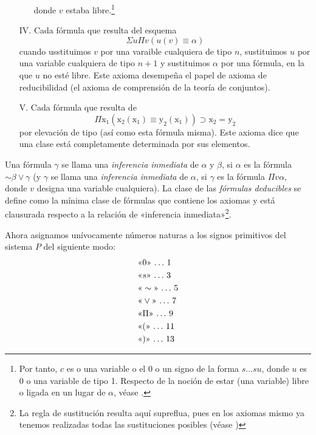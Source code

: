 \begin{enumerate}
\begin{enumerate}
                            donde $v$ estaba libre.\footnote{Por tanto, $c$ es o una variable o el $0$ o un signo de la forma $s\dots su$, donde $u$ es $0$ o una variable
                            de tipo 1. Respecto de la noción de estar (una variable) libre o ligada en un lugar de $\alpha$, véase \cite{v1927hilbertschen}.}
                \end{enumerate}
    \item[IV.]  Cada fórmula que resulta del esquema $$ \Sigma u \Pi v (u(v) \equiv \alpha) $$ cuando usstituimos $v$ por una varaible cualquiera de tipo $n$, sustituimos
                $u$ por una variable cualquiera de tipo $n+1$ y sustituimos $\alpha$ por una fórmula, en la que $u$ no esté libre. Este axioma desempeña el papel de axioma
                de reducibilidad (el axioma de comprensión de la teoría de conjuntos).
    \item[V.]   Cada fórmula que resulta de $$\Pi \text{x}_1 (\text{x}_2 (\text{x}_1) \equiv \text{y}_2(\text{x}_1)) \supset \text{x}_2 = \text{y}_2$$ por elevación de tipo
                (así como esta fórmula misma). Este axioma dice que una clase está completamente determinada por sus elementos.
\end{enumerate}

Una fórmula $\gamma$ se llama una \textit{inferencia inmediata} de $\alpha$ y $\beta$, si $\alpha$ es la fórmula $\sim \beta \vee \gamma$ (y $\gamma$ se llama una 
\textit{inferencia inmediata} de $\alpha$, si $\gamma$ es la fórmula $\Pi v \alpha $, donde $v$ designa una variable cualquiera). La clase de las \textit{fórmulas deducibles}
se define como la mínima clase de fórmulas que contiene los axiomas y está clausurada respecto a la relación de «inferencia inmediata»\footnote{La regla de sustitución 
resulta aquí supreflua, pues en los axiomas mismo ya tenemos realizadas todas las sustituciones posibles (véase \cite{v1927hilbertschen})}.

Ahora asignamos unívocamente números naturas a los signos primitivos del sistema $P$ del siguiente modo:
\begin{equation}
    \begin{aligned}
        &\text{«}0\text{»} \thinspace \dots \thinspace 1 \\
        &\text{«}s\text{»} \thinspace \dots \thinspace 3 \\
        &\text{«}\sim\text{»} \thinspace \dots \thinspace 5 \\
        &\text{«}\vee\text{»} \thinspace \dots \thinspace 7 \\
        &\text{«}\Pi\text{»} \thinspace \dots \thinspace 9 \\
        &\text{«}(\text{»} \thinspace \dots \thinspace 11 \\
        &\text{«})\text{»} \thinspace \dots \thinspace 13 \\    
    \end{aligned}
\end{equation}

